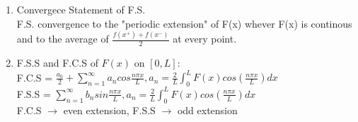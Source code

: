 \documentclass[10pt]{article}
\begin{document}
\begin{multicols}{2}
\begin{enumerate}
\begin{enumerate}
		\item Convergece Statement of F.S.\\
		F.S. convergence to the "periodic extension" of F(x) whever F(x) is continous and to the average of $\frac{f(x^+)+f(x^-)}{2}$ at every point.
		
		\item F.S.S and F.C.S of $F(x)$ on $[0,L]$:\\
		F.C.S = $\frac{a_0}{2} + \sum_{n=1}^{\infty}a_ncos\frac{n\pi x}{L},
		a_n = \frac{2}{L}\int_{0}^{L}F(x)cos(\frac{n\pi x}{L})dx$\\
		F.S.S = $\sum_{n=1}^{\infty}b_nsin\frac{n\pi x}{L},
		a_n = \frac{2}{L}\int_{0}^{L}F(x)cos(\frac{n\pi x}{L})dx$\\
		F.C.S $\rightarrow$ even extension, F.S.S $\rightarrow$ odd extension
	\end{enumerate}


\end{enumerate}
\end{multicols}
\end{document}
